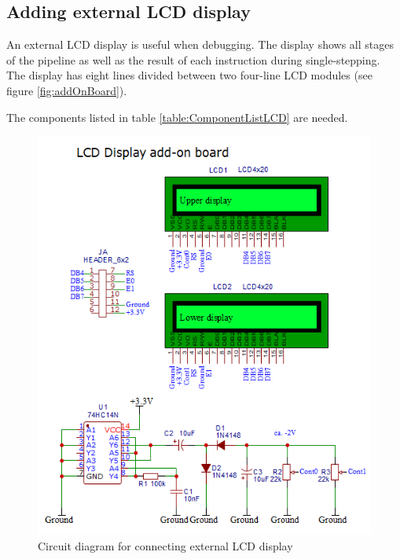 \documentclass[11pt,a4paper,oneside,openright]{report}
\newcommand{\vv}{ \vspace{2mm} }   %
\begin{document}
\subsection{Adding external LCD display} \label{Chap:ExternalLCDDisplay}
An external LCD display is useful when debugging. The display shows all stages of the pipeline as well as the result of each instruction during single-stepping. The display has eight lines divided between two four-line LCD modules (see figure \ref{fig:addOnBoard}).
\vv

The components listed in table \ref{table:ComponentListLCD} are needed. 
\vv

\begin{center}
\begin{figure}[ht]
\includegraphics[width=\textwidth]{SchematicLCDdisplay.png}
\caption{Circuit diagram for connecting external LCD display}
\label{fig:LCDdisplayDiagram}
\end{figure}
\end{center}
\end{document}
